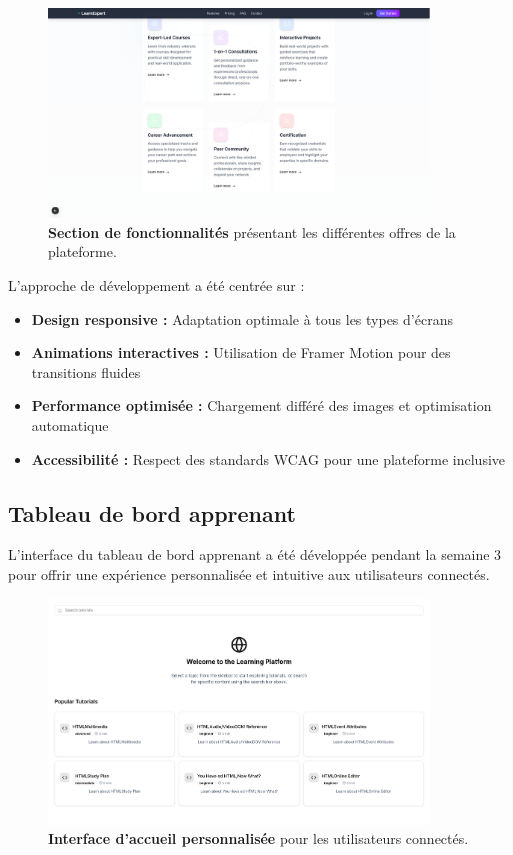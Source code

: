 \begin{figure}[H]
  \centering
  \includegraphics[width=0.9\textwidth,keepaspectratio]{week_2_img/fetchersection_2.png}
  \caption{\textbf{Section de fonctionnalités} présentant les différentes offres de la plateforme.}
  \label{fig:features_section}
\end{figure}

L'approche de développement a été centrée sur :
\begin{itemize}
  \item \textbf{Design responsive :} Adaptation optimale à tous les types d'écrans
  \item \textbf{Animations interactives :} Utilisation de Framer Motion pour des transitions fluides
  \item \textbf{Performance optimisée :} Chargement différé des images et optimisation automatique
  \item \textbf{Accessibilité :} Respect des standards WCAG pour une plateforme inclusive
\end{itemize}

\subsection{Tableau de bord apprenant}

L'interface du tableau de bord apprenant a été développée pendant la semaine 3 pour offrir une expérience personnalisée et intuitive aux utilisateurs connectés.

\begin{figure}[H]
  \centering
  \includegraphics[width=0.9\textwidth,keepaspectratio]{week_3_img/accueil.png}
  \caption{\textbf{Interface d'accueil personnalisée} pour les utilisateurs connectés.}
  \label{fig:dashboard}
\end{figure}

